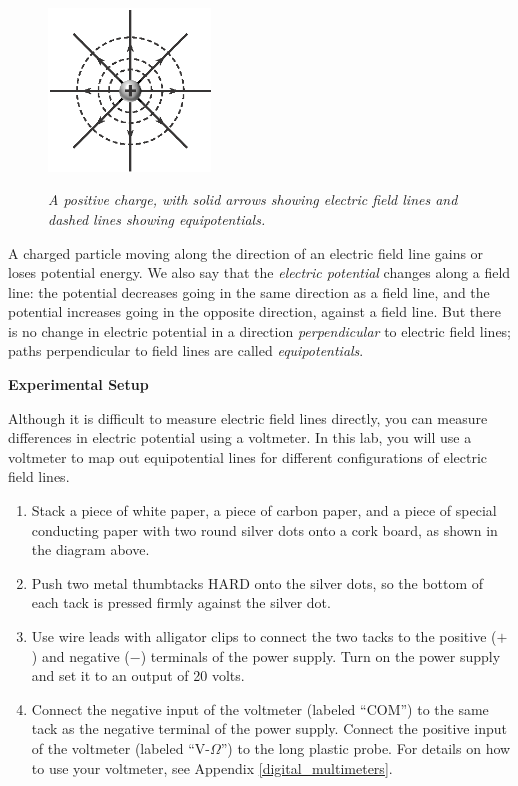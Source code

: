 {\setlength{\columnsep}{0.4in}%
\begin{figure}
\vspace{-0.2in}
{\centering \includegraphics[width=1.7in]{electric_fields_and_equipotential_lines/field_and_potential.eps} \par}

\textit{\small{A positive charge, with solid arrows showing electric field lines and dashed lines showing equipotentials.}}
\end{figure}

A charged particle moving along the direction of an electric field line gains or loses potential energy.  We also say that the \textit{electric potential} changes along a field line: the potential decreases going in the same direction as a field line, and the potential increases going in the opposite direction, against a field line.  But there is no change in electric potential in a direction \textit{perpendicular} to electric field lines; paths perpendicular to field lines are called \textit{equipotentials}.

\bigskip

\textbf{Experimental Setup}


Although it is difficult to measure electric field lines directly, you can measure differences in electric potential using a voltmeter.  In this lab, you will use a voltmeter to map out equipotential lines for different configurations of electric field lines.  

}%

\begin{enumerate}[nosep]
\item Stack a piece of white paper, a piece of carbon paper, and a piece of special conducting paper with two round silver dots onto a cork board, as shown in the diagram above.
\item Push two metal thumbtacks HARD onto the silver dots, so the bottom of each tack is pressed firmly against the silver dot.
\item Use wire leads with alligator clips to connect the two tacks to the positive ($+$) and negative ($-$) terminals of the power supply.  Turn on the power supply and set it to an output of 20 volts.
\item Connect the negative input of the voltmeter (labeled ``COM'') to the same tack as the negative terminal of the power supply.  Connect the positive input of the voltmeter (labeled ``V-$\Omega$'') to the long plastic probe.  For details on how to use your voltmeter, see Appendix \ref{digital_multimeters}.
\end{enumerate}

